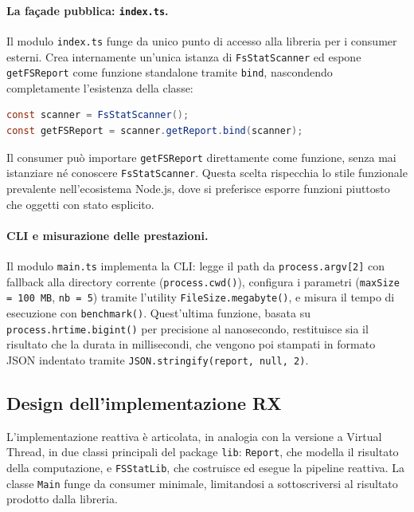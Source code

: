 \documentclass[11pt,a4paper]{article}
\begin{document}
\paragraph{La façade pubblica: \texttt{index.ts}.}

Il modulo \texttt{index.ts} funge da unico punto di accesso alla libreria per i consumer esterni. Crea internamente un'unica istanza di \texttt{FsStatScanner} ed espone \texttt{getFSReport} come funzione standalone tramite \texttt{bind}, nascondendo completamente l'esistenza della classe:

\begin{lstlisting}[language=Java]
const scanner = FsStatScanner();
const getFSReport = scanner.getReport.bind(scanner);
\end{lstlisting}

Il consumer può importare \texttt{getFSReport} direttamente come funzione, senza mai istanziare né conoscere \texttt{FsStatScanner}. Questa scelta rispecchia lo stile funzionale prevalente nell'ecosistema Node.js, dove si preferisce esporre funzioni piuttosto che oggetti con stato esplicito.

\paragraph{CLI e misurazione delle prestazioni.}

Il modulo \texttt{main.ts} implementa la CLI: legge il path da \texttt{process.argv[2]} con fallback alla directory corrente (\texttt{process.cwd()}), configura i parametri (\texttt{maxSize = 100 MB}, \texttt{nb = 5}) tramite l'utility \texttt{FileSize.megabyte()}, e misura il tempo di esecuzione con \texttt{benchmark()}. Quest'ultima funzione, basata su \texttt{process.hrtime.bigint()} per precisione al nanosecondo, restituisce sia il risultato che la durata in millisecondi, che vengono poi stampati in formato JSON indentato tramite \texttt{JSON.stringify(report, null, 2)}.

\subsection{Design dell'implementazione RX}

L'implementazione reattiva è articolata, in analogia con la versione a Virtual Thread, in due classi principali del package \texttt{lib}: \texttt{Report}, che modella il risultato della computazione, e \texttt{FSStatLib}, che costruisce ed esegue la pipeline reattiva. La classe \texttt{Main} funge da consumer minimale, limitandosi a sottoscriversi al risultato prodotto dalla libreria.
\end{document}
